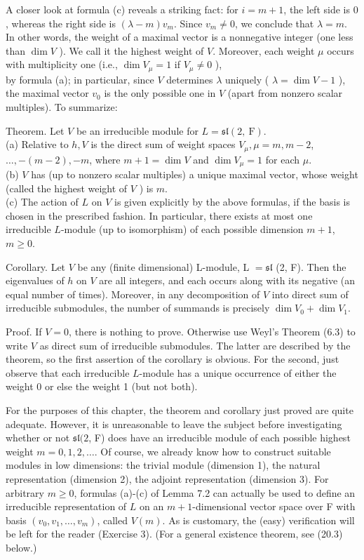 \documentclass[10pt]{article}
\begin{document}
A closer look at formula (c) reveals a striking fact: for $i=m+1$, the left side is 0 , whereas the right side is $(\lambda-m) v_{m}$. Since $v_{m} \neq 0$, we conclude that $\lambda=m$. In other words, the weight of a maximal vector is a nonnegative integer (one less than $\operatorname{dim} V$ ). We call it the highest weight of $V$. Moreover, each weight $\mu$ occurs with multiplicity one (i.e., $\operatorname{dim} V_{\mu}=1$ if $V_{\mu} \neq 0$ ),\\
by formula (a); in particular, since $V$ determines $\lambda$ uniquely ( $\lambda=\operatorname{dim} V-1$ ), the maximal vector $v_{0}$ is the only possible one in $V$ (apart from nonzero scalar multiples). To summarize:

Theorem. Let $V$ be an irreducible module for $L=\mathfrak{s l}(2, \mathrm{~F})$.\\
(a) Relative to $h, V$ is the direct sum of weight spaces $V_{\mu}, \mu=m, m-2$, $\ldots,-(m-2),-m$, where $m+1=\operatorname{dim} V$ and $\operatorname{dim} V_{\mu}=1$ for each $\mu$.\\
(b) $V$ has (up to nonzero scalar multiples) a unique maximal vector, whose weight (called the highest weight of $V$ ) is $m$.\\
(c) The action of $L$ on $V$ is given explicitly by the above formulas, if the basis is chosen in the prescribed fashion. In particular, there exists at most one irreducible $L$-module (up to isomorphism) of each possible dimension $m+1$, $m \geq 0$.

Corollary. Let $V$ be any (finite dimensional) L-module, L $=\mathfrak{s l}$ (2, F). Then the eigenvalues of $h$ on $V$ are all integers, and each occurs along with its negative (an equal number of times). Moreover, in any decomposition of $V$ into direct sum of irreducible submodules, the number of summands is precisely $\operatorname{dim} V_{0}+\operatorname{dim} V_{1}$.

Proof. If $V=0$, there is nothing to prove. Otherwise use Weyl's Theorem (6.3) to write $V$ as direct sum of irreducible submodules. The latter are described by the theorem, so the first assertion of the corollary is obvious. For the second, just observe that each irreducible $L$-module has a unique occurrence of either the weight 0 or else the weight 1 (but not both).

For the purposes of this chapter, the theorem and corollary just proved are quite adequate. However, it is unreasonable to leave the subject before investigating whether or not $\mathfrak{s l}(2$, F) does have an irreducible module of each possible highest weight $m=0,1,2, \ldots$. Of course, we already know how to construct suitable modules in low dimensions: the trivial module (dimension 1), the natural representation (dimension 2), the adjoint representation (dimension 3). For arbitrary $m \geq 0$, formulas (a)-(c) of Lemma 7.2 can actually be used to define an irreducible representation of $L$ on an $m+1$-dimensional vector space over F with basis $\left(v_{0}, v_{1}, \ldots, v_{m}\right)$, called $V(m)$. As is customary, the (easy) verification will be left for the reader (Exercise 3). (For a general existence theorem, see (20.3) below.)
\end{document}
